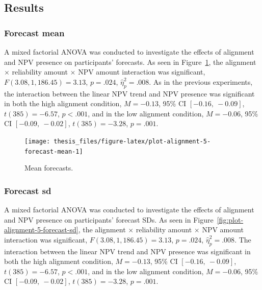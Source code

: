 \documentclass[a4paper, nobind, dvipsnames]{templates/ociamthesis}
\theoremstyle{definition}
\theoremstyle{definition}
\theoremstyle{definition}
\theoremstyle{definition}
\theoremstyle{remark}
\begin{document}
\hypertarget{results-8}{%
\subsection{Results}\label{results-8}}

\hypertarget{forecast-mean-2}{%
\subsubsection{Forecast mean}\label{forecast-mean-2}}

A mixed factorial ANOVA was conducted to investigate the effects of alignment
and NPV presence on participants' forecasts. As seen in
Figure~\ref{fig:plot-alignment-5-forecast-mean}, the alignment \(\times\)
reliability amount \(\times\) NPV amount interaction was significant,
\(F(3.08, 1,186.45) = 3.13\), \(p = .024\), \(\hat{\eta}^2_p = .008\).
As in the previous experiments, the interaction between the linear
NPV trend and NPV presence was significant in both the high alignment condition,
\(M = -0.13\), 95\% CI \([-0.16,~-0.09]\), \(t(385) = -6.57\), \(p < .001\), and in the
low alignment condition,
\(M = -0.06\), 95\% CI \([-0.09,~-0.02]\), \(t(385) = -3.28\), \(p = .001\).



\begin{figure}
\texttt{[image: thesis\_files/figure-latex/plot-alignment-5-forecast-mean-1]} \caption{Mean forecasts.}\label{fig:plot-alignment-5-forecast-mean}
\end{figure}

\hypertarget{forecast-sd-alignment-5}{%
\subsubsection{Forecast sd}\label{forecast-sd-alignment-5}}

A mixed factorial ANOVA was conducted to investigate the effects of alignment
and NPV presence on participants' forecast SDs. As seen in
Figure~\ref{fig:plot-alignment-5-forecast-sd}, the alignment \(\times\)
reliability amount \(\times\) NPV amount interaction was significant,
\(F(3.08, 1,186.45) = 3.13\), \(p = .024\), \(\hat{\eta}^2_p = .008\).
The interaction between the linear NPV trend and NPV presence was significant in
both the high alignment condition,
\(M = -0.13\), 95\% CI \([-0.16,~-0.09]\), \(t(385) = -6.57\), \(p < .001\), and in the
low alignment condition,
\(M = -0.06\), 95\% CI \([-0.09,~-0.02]\), \(t(385) = -3.28\), \(p = .001\).
\end{document}
